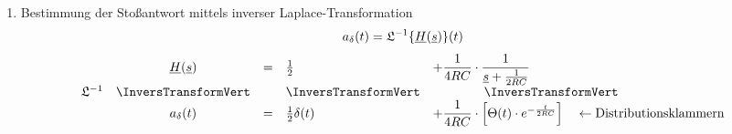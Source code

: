 \begin{enumerate}
  \item Bestimmung der Stoßantwort mittels inverser Laplace-Transformation
    \[a_\delta(t) = \mathfrak{L}^{-1}\{\underline{H}(\underline{s})\}(t)\]
    \[\begin{array}{lccll}
      &\cn{H}(\cn{s})
        &= &\frac{1}{2}&+\dfrac{1}{4RC}\cdot\dfrac{1}{\cn{s}+\frac{1}{2RC}}\\
      \mathfrak{L}^{-1} &\InversTransformVert & 
        &\InversTransformVert&\qquad\qquad\InversTransformVert  \\
      &a_\delta(t) &= &\frac{1}{2}\delta(t) 
        &+ \dfrac{1}{4RC}\cdot\left[\Theta(t)\cdot e^{-\frac{t}{2RC}}\right]
        \quad\leftarrow\text{Distributionsklammern}
    \end{array}\]

\end{enumerate}


